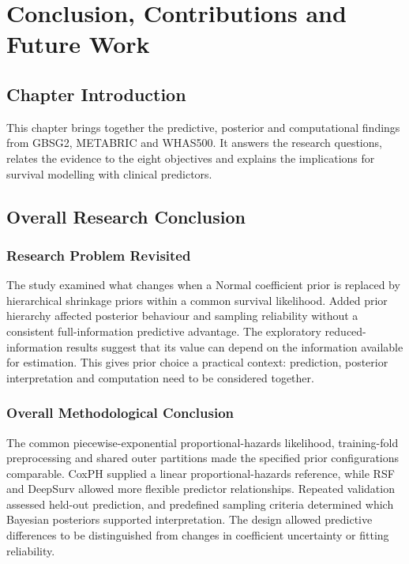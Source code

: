 \chapter{Conclusion, Contributions and Future Work}\label{conclusion-contributions-and-future-work}

\section{Chapter Introduction}\label{chapter-introduction}

This chapter brings together the predictive, posterior and computational findings from GBSG2, METABRIC and WHAS500. It answers the research questions, relates the evidence to the eight objectives and explains the implications for survival modelling with clinical predictors.

\section{Overall Research Conclusion}\label{overall-research-conclusion}

\subsection{Research Problem Revisited}\label{research-problem-revisited}

The study examined what changes when a Normal coefficient prior is replaced by hierarchical shrinkage priors within a common survival likelihood. Added prior hierarchy affected posterior behaviour and sampling reliability without a consistent full-information predictive advantage. The exploratory reduced-information results suggest that its value can depend on the information available for estimation. This gives prior choice a practical context: prediction, posterior interpretation and computation need to be considered together.

\subsection{Overall Methodological Conclusion}\label{overall-methodological-conclusion}

The common piecewise-exponential proportional-hazards likelihood, training-fold preprocessing and shared outer partitions made the specified prior configurations comparable. CoxPH supplied a linear proportional-hazards reference, while RSF and DeepSurv allowed more flexible predictor relationships. Repeated validation assessed held-out prediction, and predefined sampling criteria determined which Bayesian posteriors supported interpretation. The design allowed predictive differences to be distinguished from changes in coefficient uncertainty or fitting reliability.

